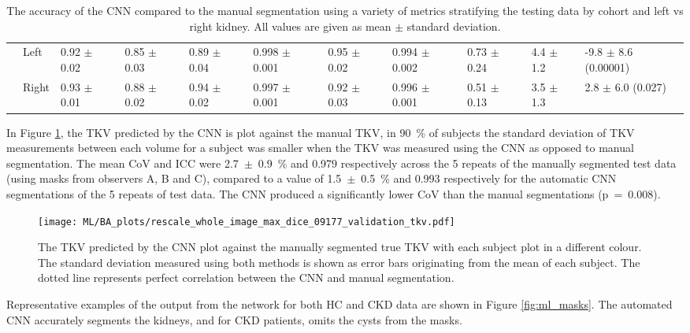 \begin{landscape}
\begin{table}[H]
\begin{adjustbox}{width=\hsize, center}
\begin{tabularx}{1.3\hsize}{XX||X|X|X|X|X|X|X|X|X}
		& Left   & 0.92 $\pm$ 0.02   & 0.85 $\pm$ 0.03     & 0.89 $\pm$ 0.04   & 0.998 $\pm$ 0.001   & 0.95 $\pm$ 0.02   & 0.994 $\pm$ 0.002   & 0.73 $\pm$ 0.24                  & 4.4 $\pm$ 1.2                                 & -9.8 $\pm$ 8.6   (0.00001) \\ \cline{2-11} 
		& Right  & 0.93 $\pm$   0.01 & 0.88 $\pm$   0.02   & 0.94 $\pm$   0.02 & 0.997   $\pm$ 0.001 & 0.92 $\pm$   0.03 & 0.996   $\pm$ 0.001 & 0.51 $\pm$   0.13                & 3.5 $\pm$   1.3                               & 2.8 $\pm$   6.0 (0.027)   
	\end{tabularx}
	\end{adjustbox}
	\caption{The accuracy of the \ac{CNN} compared to the manual segmentation using a variety of metrics stratifying the testing data by cohort and left vs right kidney. All values are given as mean $\pm$ standard deviation. }
	\label{tab:ml_testing_metrics}
\end{table}
\end{landscape}

In Figure \ref{fig:ml_testing_corr}, the \ac{TKV} predicted by the CNN is plot against the manual \ac{TKV}, in 90~\% of subjects the standard deviation of \ac{TKV} measurements between each volume for a subject was smaller when the \ac{TKV} was measured using the \ac{CNN} as opposed to manual segmentation. The mean \ac{CoV} and \ac{ICC} were 2.7~$\pm$~0.9~\% and 0.979 respectively across the 5 repeats of the manually segmented test data (using masks from observers A, B and C), compared to a value of 1.5~$\pm$~0.5~\% and 0.993 respectively for the automatic \ac{CNN} segmentations of the 5 repeats of test data. The \ac{CNN} produced a significantly lower \ac{CoV} than the manual segmentations (p~=~0.008).

\begin{figure}[H]
	\centering
	\texttt{[image: ML/BA\_plots/rescale\_whole\_image\_max\_dice\_09177\_validation\_tkv.pdf]}
	\caption{The \ac{TKV} predicted by the \ac{CNN} plot against the manually segmented true \ac{TKV} with each subject plot in a different colour. The standard deviation measured using both methods is shown as error bars originating from the mean of each subject. The dotted line represents perfect correlation between the \ac{CNN} and manual segmentation.}
	\label{fig:ml_testing_corr}	
\end{figure}

Representative examples of the output from the network for both \ac{HC} and \ac{CKD} data are shown in Figure \ref{fig:ml_masks}. The automated \ac{CNN} accurately segments the kidneys, and for \ac{CKD} patients, omits the cysts from the masks. 

